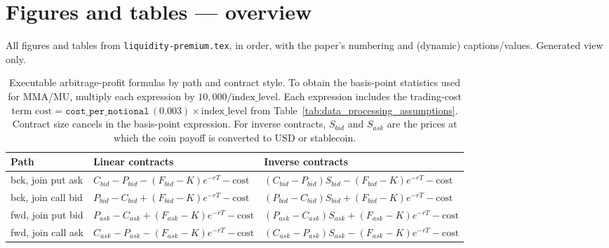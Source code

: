 \documentclass[12pt]{article}
\newcommand{\CostPerNotional}{0.003}%
\begin{document}
\section*{Figures and tables --- overview}
{\small All figures and tables from \texttt{liquidity-premium.tex}, in order, with the paper's numbering and (dynamic) captions/values. Generated view only.}
\bigskip


\begin{table}[htbp]
\centering
\footnotesize
\caption{Executable arbitrage-profit formulas by path and contract style. To obtain the basis-point statistics used for MMA/MU, multiply each expression by $10{,}000/\mathrm{index\_level}$. Each expression includes the trading-cost term $\mathrm{cost}=\texttt{cost\_per\_notional}\,(\CostPerNotional)\times \mathrm{index\_level}$ from Table~\ref{tab:data_processing_assumptions}. Contract size cancels in the basis-point expression. For inverse contracts, $S_{bid}$ and $S_{ask}$ are the prices at which the coin payoff is converted to USD or stablecoin.}
\label{tab:arbitrage_eight_formulas}
\setlength{\tabcolsep}{3pt}
\begin{tabularx}{0.98\textwidth}{@{}>{\RaggedRight\arraybackslash}p{}>{\RaggedRight\arraybackslash}p{}>{\RaggedRight\arraybackslash}p{}@{}}
\toprule
Path & Linear contracts & Inverse contracts \\
\midrule
bck, join put ask &
$C_{bid}-P_{bid}-(F_{bid}-K)e^{-rT}-\mathrm{cost}$ &
$(C_{bid}-P_{bid})S_{bid}-(F_{bid}-K)e^{-rT}-\mathrm{cost}$ \\
bck, join call bid &
$P_{bid}-C_{bid}+(F_{bid}-K)e^{-rT}-\mathrm{cost}$ &
$(P_{bid}-C_{bid})S_{bid}+(F_{bid}-K)e^{-rT}-\mathrm{cost}$ \\
fwd, join put bid &
$P_{ask}-C_{ask}+(F_{ask}-K)e^{-rT}-\mathrm{cost}$ &
$(P_{ask}-C_{ask})S_{ask}+(F_{ask}-K)e^{-rT}-\mathrm{cost}$ \\
fwd, join call ask &
$C_{ask}-P_{ask}-(F_{ask}-K)e^{-rT}-\mathrm{cost}$ &
$(C_{ask}-P_{ask})S_{ask}-(F_{ask}-K)e^{-rT}-\mathrm{cost}$ \\
\bottomrule
\end{tabularx}
\end{table}
\end{document}
